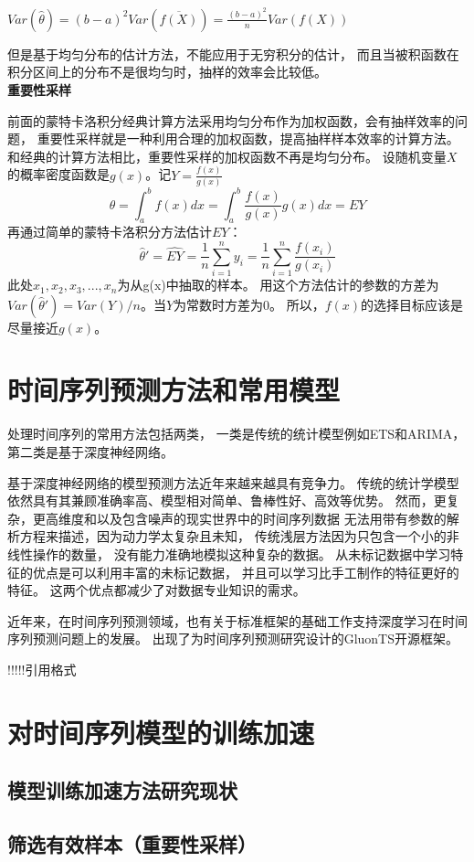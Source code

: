 $Var(\hat{\theta})=(b-a)^2 Var(\overline{f(X)})=\frac{(b-a)^2}{n}Var(f(X))$

但是基于均匀分布的估计方法，不能应用于无穷积分的估计，
而且当被积函数在积分区间上的分布不是很均匀时，抽样的效率会比较低。\\

\textbf{重要性采样}

前面的蒙特卡洛积分经典计算方法采用均匀分布作为加权函数，会有抽样效率的问题，
重要性采样就是一种利用合理的加权函数，提高抽样样本效率的计算方法。
和经典的计算方法相比，重要性采样的加权函数不再是均匀分布。
设随机变量$X$的概率密度函数是$g(x)$。记$Y=\frac{f(x)}{g(x)}$
\begin{equation}
    \theta=\int_a^b f(x)dx = \int_a^b \frac{f(x)}{g(x)}g(x)dx=EY
\end{equation}
再通过简单的蒙特卡洛积分方法估计$EY$：
\begin{equation}
    \hat{\theta}'=\hat{EY}=\frac{1}{n}\sum_{i=1}^{n}y_i=\frac{1}{n}\sum_{i=1}^{n}\frac{f(x_i)}{g(x_i)}
\end{equation}
此处$x_1,x_2,x_3,...,x_n$为从g(x)中抽取的样本。
用这个方法估计的参数的方差为
$Var(\hat{\theta}')=Var(Y)/n$。当$Y$为常数时方差为0。
所以，$f(x)$的选择目标应该是尽量接近$g(x)$。

\section{时间序列预测方法和常用模型}
处理时间序列的常用方法包括两类，
一类是传统的统计模型例如ETS和ARIMA，第二类是基于深度神经网络。

基于深度神经网络的模型预测方法近年来越来越具有竞争力。
传统的统计学模型依然具有其兼顾准确率高、模型相对简单、鲁棒性好、高效等优势。
然而，更复杂，更高维度和以及包含噪声的现实世界中的时间序列数据
无法用带有参数的解析方程来描述，因为动力学太复杂且未知，
传统浅层方法因为只包含一个小的非线性操作的数量，
没有能力准确地模拟这种复杂的数据。
从未标记数据中学习特征的优点是可以利用丰富的未标记数据，
并且可以学习比手工制作的特征更好的特征。
这两个优点都减少了对数据专业知识的需求。

近年来，在时间序列预测领域，也有关于标准框架的基础工作支持深度学习在时间序列预测问题上的发展。
出现了为时间序列预测研究设计的GluonTS开源框架\citep{DBLP:journals/corr/abs-1906-05264}。

!!!!!引用格式

\section{对时间序列模型的训练加速}
\subsection{模型训练加速方法研究现状}
\subsection{筛选有效样本（重要性采样）}
